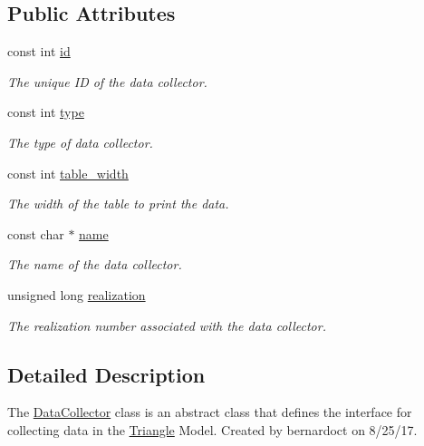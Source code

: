 \subsection*{Public Attributes}
\begin{DoxyCompactItemize}
\item 
const int \mbox{\hyperlink{classDataCollector_a5cb840b6fbcf6afe364eef9114984383}{id}}
\begin{DoxyCompactList}\small\item\em The unique ID of the data collector. \end{DoxyCompactList}\item 
const int \mbox{\hyperlink{classDataCollector_acad1c22d67a8eb3db056ba776a131900}{type}}
\begin{DoxyCompactList}\small\item\em The type of data collector. \end{DoxyCompactList}\item 
const int \mbox{\hyperlink{classDataCollector_af46c27a47de92d92dcdae6b26a905a44}{table\+\_\+width}}
\begin{DoxyCompactList}\small\item\em The width of the table to print the data. \end{DoxyCompactList}\item 
const char $\ast$ \mbox{\hyperlink{classDataCollector_a3a9a5033592f72ada429aa20056162b9}{name}}
\begin{DoxyCompactList}\small\item\em The name of the data collector. \end{DoxyCompactList}\item 
unsigned long \mbox{\hyperlink{classDataCollector_a9ef2887466fe3123aa19ef956a219b96}{realization}}
\begin{DoxyCompactList}\small\item\em The realization number associated with the data collector. \end{DoxyCompactList}\end{DoxyCompactItemize}


\subsection{Detailed Description}
The {\ttfamily \mbox{\hyperlink{classDataCollector}{Data\+Collector}}} class is an abstract class that defines the interface for collecting data in the \mbox{\hyperlink{classTriangle}{Triangle}} Model. Created by bernardoct on 8/25/17. 

